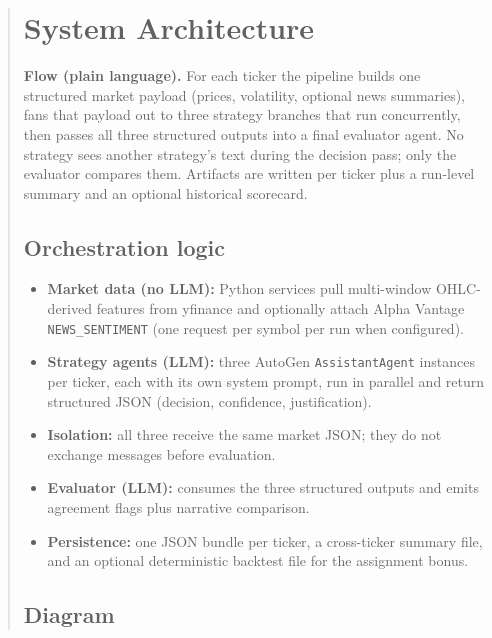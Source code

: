 \documentclass[11pt]{article}
\begin{document}
\begin{abstract}
\section{System Architecture}

\noindent\textbf{Flow (plain language).} For each ticker the pipeline builds one structured market payload (prices, volatility, optional news summaries), fans that payload out to three strategy branches that run concurrently, then passes all three structured outputs into a final evaluator agent. No strategy sees another strategy's text during the decision pass; only the evaluator compares them. Artifacts are written per ticker plus a run-level summary and an optional historical scorecard.

\subsection{Orchestration logic}
\begin{itemize}
  \item \textbf{Market data (no LLM):} Python services pull multi-window OHLC-derived features from yfinance and optionally attach Alpha Vantage \texttt{NEWS\_SENTIMENT} (one request per symbol per run when configured).
  \item \textbf{Strategy agents (LLM):} three AutoGen \texttt{AssistantAgent} instances per ticker, each with its own system prompt, run in parallel and return structured JSON (decision, confidence, justification).
  \item \textbf{Isolation:} all three receive the same market JSON; they do not exchange messages before evaluation.
  \item \textbf{Evaluator (LLM):} consumes the three structured outputs and emits agreement flags plus narrative comparison.
  \item \textbf{Persistence:} one JSON bundle per ticker, a cross-ticker summary file, and an optional deterministic backtest file for the assignment bonus.
\end{itemize}

\subsection{Diagram}
\begin{center}
\end{center}


\end{abstract}
\end{document}
